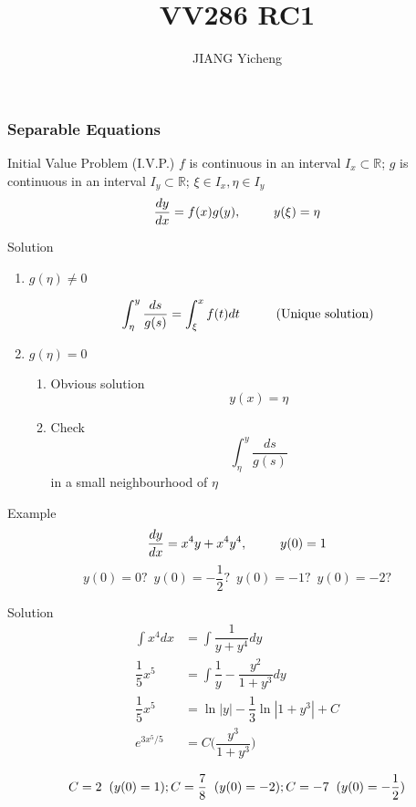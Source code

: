 \documentclass{beamer}
\title{\textcolor[rgb]{0,0.168,0.376}{VV286 RC1}}
\author{JIANG Yicheng}
\begin{document}
\begin{frame}
\titlepage
\end{frame}


\begin{frame}
\frametitle{Separable Equations}
\begin{block}{Initial Value Problem (I.V.P.)}
$f$ is continuous in an interval $I_x\subset \mathbb{R}$; $g$ is continuous in an interval $I_y\subset \mathbb{R}$; $\xi\in I_x, \eta\in I_y$ 
$$\dfrac{dy}{dx}=f(x)g(y),\hspace{9mm}y(\xi)=\eta$$
\end{block}


\end{frame}
\begin{frame}
\begin{block}{Solution}
\begin{enumerate}
\item $g(\eta)\neq0$


$$\int_{\eta}^y\dfrac{ds}{g(s)}=\int_{\xi}^xf(t)dt\hspace{10mm} \text{(Unique solution)}$$
\item $g(\eta)=0$
\begin{enumerate}
\item Obvious solution
$$y(x)=\eta$$
\item Check $$\int_{\eta}^y\dfrac{ds}{g(s)}$$
in a small neighbourhood of $\eta$
\end{enumerate}
\end{enumerate}
\end{block}
\end{frame}


\begin{frame}
\begin{block}{Example}
$$\dfrac{dy}{dx}=x^4y+x^4y^4, \hspace{9mm}y(0)=1$$
$$y(0)=0?\,\,\,y(0)=-\dfrac{1}{2}?\,\,\,y(0)=-1?\,\,\,y(0)=-2?$$

\end{block}
\end{frame}

\begin{frame}
\begin{block}{Solution}
\begin{align*}
\int x^4dx&=\int \dfrac{1}{y+y^4}dy\\
\dfrac{1}{5}x^5&=\int \dfrac{1}{y}-\dfrac{y^2}{1+y^3}dy\\
\dfrac{1}{5}x^5&=\ln |y|-\dfrac{1}{3}\ln |1+y^3|+C\\
e^{3x^5/5}&=C\Bigg(\dfrac{y^3}{1+y^3}\Bigg)\\
\end{align*}
$$C=2\hspace{2mm}(y(0)=1);C=\dfrac{7}{8}\hspace{2mm}(y(0)=-2);C=-7\hspace{2mm}(y(0)=-\dfrac{1}{2})$$
\end{block}
\end{frame}
\end{document}
